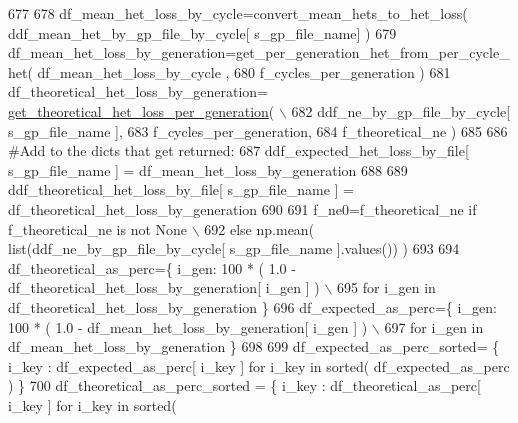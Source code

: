 \begin{DoxyCode}
677 
678         df\_mean\_het\_loss\_by\_cycle=convert\_mean\_hets\_to\_het\_loss( ddf\_mean\_het\_by\_gp\_file\_by\_cycle[ 
      s\_gp\_file\_name]  )
679         df\_mean\_het\_loss\_by\_generation=get\_per\_generation\_het\_from\_per\_cycle\_het( df\_mean\_het\_loss\_by\_cycle
      , 
680                                                                                         
      f\_cycles\_per\_generation )
681         df\_theoretical\_het\_loss\_by\_generation=
      \hyperlink{namespacenegui_1_1pgvalidationtests_ab5c519679dcc75c116bcbd7883107cfb}{get\_theoretical\_het\_loss\_per\_generation}( \(\backslash\)
682                                                             ddf\_ne\_by\_gp\_file\_by\_cycle[ s\_gp\_file\_name ], 
683                                                                                         
      f\_cycles\_per\_generation,
684                                                                                         f\_theoretical\_ne )
685     
686         \textcolor{comment}{#Add to the dicts that get returned:}
687         ddf\_expected\_het\_loss\_by\_file[ s\_gp\_file\_name ] = df\_mean\_het\_loss\_by\_generation
688 
689         ddf\_theoretical\_het\_loss\_by\_file[ s\_gp\_file\_name ] = df\_theoretical\_het\_loss\_by\_generation
690 
691         f\_ne0=f\_theoretical\_ne \textcolor{keywordflow}{if} f\_theoretical\_ne \textcolor{keywordflow}{is} \textcolor{keywordflow}{not} \textcolor{keywordtype}{None} \(\backslash\)
692                 \textcolor{keywordflow}{else} np.mean( list(ddf\_ne\_by\_gp\_file\_by\_cycle[ s\_gp\_file\_name ].values()) ) 
693 
694         df\_theoretical\_as\_perc=\{ i\_gen: 100 * ( 1.0 - df\_theoretical\_het\_loss\_by\_generation[ i\_gen ] ) \(\backslash\)
695                                                                             \textcolor{keywordflow}{for} i\_gen \textcolor{keywordflow}{in} 
      df\_theoretical\_het\_loss\_by\_generation \} 
696         df\_expected\_as\_perc=\{ i\_gen: 100 * ( 1.0 - df\_mean\_het\_loss\_by\_generation[ i\_gen ] )  \(\backslash\)
697                                                             \textcolor{keywordflow}{for} i\_gen \textcolor{keywordflow}{in} df\_mean\_het\_loss\_by\_generation \}   
698 
699         df\_expected\_as\_perc\_sorted= \{ i\_key : df\_expected\_as\_perc[ i\_key ] \textcolor{keywordflow}{for} i\_key \textcolor{keywordflow}{in} sorted( 
      df\_expected\_as\_perc ) \}
700         df\_theoretical\_as\_perc\_sorted = \{ i\_key : df\_theoretical\_as\_perc[ i\_key ] \textcolor{keywordflow}{for} i\_key \textcolor{keywordflow}{in} sorted( 

\end{DoxyCode}
